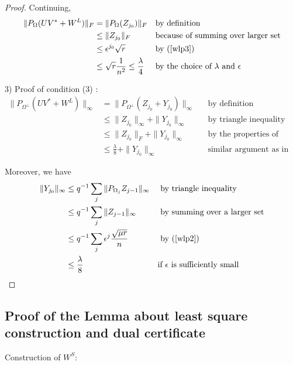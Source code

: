 \begin{proof}
Continuing,
\begin{align*}
\|P_{\Omega}(UV^{*}+W^{L})\|_{F}
& = \|P_{\Omega}(Z_{j_{0}})\|_{F}
&&\text{by definition}\\
& \le \|Z_{j_{0}}\|_{F}
&&\text{because of summing over larger set} \\
& \le \epsilon^{j_{0}} \sqrt{r}
&&\text{by (\ref{wlp3})} \\
& \le \sqrt{r}\frac{1}{n^{2}} \le \frac{\lambda}{4}
&&\text{by the choice of } \lambda \text{ and } \epsilon
\end{align*}


3) Proof of condition (3) :
\begin{align*}
\|P_{\Omega^{\bot}}(UV^{*}+W^{L})\|_{\infty}
& = \|P_{\Omega^{\bot}}(Z_{j_{0}}+Y_{j_{0}})\|_{\infty}
&&\text{by definition}\\
& \le \|Z_{j_{0}}\|_{\infty} + \|Y_{j_{0}}\|_{\infty}
&&\text{by triangle inequality and summing over larger set}\\
& \le \|Z_{j_{0}}\|_{F} + \|Y_{j_{0}}\|_{\infty}
&&\text{by the properties of Frobenius and infinite norms}\\
& \le \frac{\lambda}{8} + \|Y_{j_{0}}\|_{\infty}
&&\text{similar argument as in Proof of condition (2)}
\end{align*}


Moreover, we have
\[
\begin{aligned}
\|Y_{j_{0}}\|_{\infty}
& \le q^{-1}\sum_{j}\|P_{\Omega_{j}}Z_{j-1}\|_{\infty}
&&\text{ by triangle inequality}\\
& \le q^{-1}\sum_{j}\|Z_{j-1}\|_{\infty}
&&\text{ by summing over a larger set}\\
& \le q^{-1}\sum_{j}\epsilon^{j}\frac{\sqrt{\mu r}}{n}
&&\text{ by (\ref{wlp2})}\\
& \le \frac{\lambda}{8}
&&\text{if } \epsilon \text{ is sufficiently small}
\end{aligned}
\]

\end{proof}


\subsection{Proof of the Lemma about least square construction and dual certificate }

Construction of $W^{S}$:

